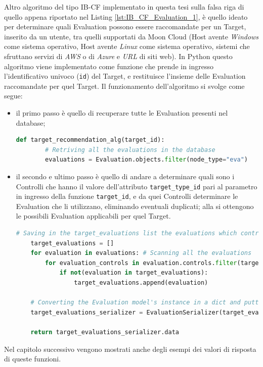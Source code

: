%
Altro algoritmo del tipo IB-CF implementato in questa tesi sulla falsa riga di quello appena riportato nel Listing \ref{lst:IB_CF_Evaluation_1}, 
è quello ideato per determinare quali Evaluation possono essere raccomandate per un Target, inserito da un utente, tra quelli supportati da Moon Cloud
(Host avente \textit{Windows} come sistema operativo, Host avente \textit{Linux} come sistema operativo, sistemi che sfruttano 
servizi di \textit{AWS} o di \textit{Azure} e \textit{URL} di siti web).\hfill\break
In Python questo algoritmo viene implementato come funzione che prende in ingresso l'identificativo univoco (\texttt{id}) del Target, e 
restituisce l'insieme delle Evaluation raccomandate per quel Target. Il funzionamento dell'algoritmo si svolge come segue:
\begin{itemize}
    \item il primo passo è quello di recuperare tutte le Evaluation presenti nel database;
    \begin{lstlisting}[language=Python, label=lst:IB_CF_Target_1]
    def target_recommendation_alg(target_id):
        # Retriving all the evaluations in the database
        evaluations = Evaluation.objects.filter(node_type="eva")
    \end{lstlisting} 
    \item il secondo e ultimo passo è quello di andare a determinare quali sono i Controlli che hanno il valore dell'attributo \texttt{target\_type\_id} 
    pari al parametro in ingresso della funzione \texttt{target\_id}, e da quei Controlli determinare le Evaluation che li utilizzano, 
    eliminando eventuali duplicati; alla si ottengono le possibili Evaluation applicabili per quel Target.
    \begin{lstlisting}[language=Python, label=lst:IB_CF_Target_2]
    # Saving in the target_evaluations list the evaluations which controls have target_type_id equal to target_id
    target_evaluations = []
    for evaluation in evaluations: # Scanning all the evaluations
        for evaluation_controls in evaluation.controls.filter(target_type_id=target_id):
            if not(evaluation in target_evaluations):
                target_evaluations.append(evaluation)
    
    # Converting the Evaluation model's instance in a dict and putting the evaluation, as a dict, in a list
    target_evaluations_serializer = EvaluationSerializer(target_evaluations, many=True)
    
    return target_evaluations_serializer.data
    \end{lstlisting} 
\end{itemize}
%
Nel capitolo successivo vengono mostrati anche degli esempi dei valori di risposta di queste funzioni.
%
